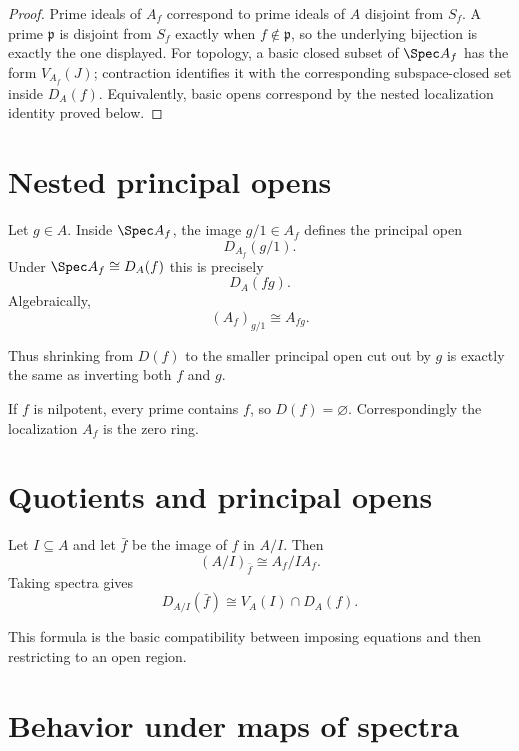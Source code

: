 \begin{proof}
Prime ideals of $A_f$ correspond to prime ideals of $A$ disjoint from $S_f$.  A prime
$\mathfrak p$ is disjoint from $S_f$ exactly when $f\notin\mathfrak p$, so the underlying
bijection is exactly the one displayed.  For topology, a basic closed subset of
$\Spec A_f$ has the form $V_{A_f}(J)$; contraction identifies it with the corresponding
subspace-closed set inside $D_A(f)$.  Equivalently, basic opens correspond by the nested
localization identity proved below.
\end{proof}



\section{Nested principal opens}

Let $g\in A$.  Inside $\Spec A_f$, the image $g/1\in A_f$ defines the principal open
\[
D_{A_f}(g/1).
\]
Under $\Spec A_f\cong D_A(f)$ this is precisely
\[
D_A(fg).
\]
Algebraically,
\[
(A_f)_{g/1}\cong A_{fg}.
\]

Thus shrinking from $D(f)$ to the smaller principal open cut out by $g$ is exactly the same
as inverting both $f$ and $g$.

\begin{example}\label{ex:vi08-expand-03}
If $f$ is nilpotent, every prime contains $f$, so $D(f)=\varnothing$.  Correspondingly the localization $A_f$ is the zero ring.
\end{example}
\section{Quotients and principal opens}

Let $I\subseteq A$ and let $\bar f$ be the image of $f$ in $A/I$.  Then
\[
(A/I)_{\bar f}\cong A_f/IA_f.
\]
Taking spectra gives
\[
D_{A/I}(\bar f)
\cong
V_A(I)\cap D_A(f).
\]



This formula is the basic compatibility between imposing equations and then restricting to
an open region.

\section{Behavior under maps of spectra}

